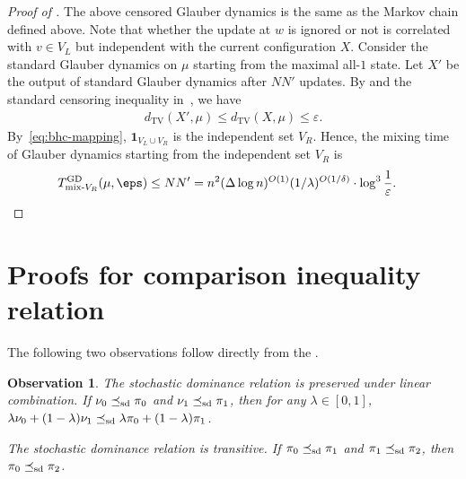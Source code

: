 \documentclass[11pt,a4paper]{article}
\newcommand{\DTV}[2]{d_{\mathrm{TV}}\left({#1},{#2}\right)}
\renewcommand{\epsilon}{\varepsilon}
\newcommand{\sd}{\preceq_{\textnormal{sd}}}
\newtheorem{observation}[theorem]{Observation}
\theoremstyle{definition}
\def\*#1{\mathbf{#1}} %
\begin{document}
\begin{proof}[Proof of ]
The above censored Glauber dynamics is the same as the Markov chain defined above. 
Note that whether the update at $w$ is ignored or not is correlated with $v \in V_L$ but independent with the current configuration $X$.
Consider the standard Glauber dynamics on $\mu$ starting from the maximal all-$1$ state. Let $X'$ be the output of standard Glauber dynamics after $N N'$ updates. By  and the standard censoring inequality in~\cite{peres2013can}, we have
\begin{align*}
    \DTV{X'}{\mu} \leq \DTV{X}{\mu} \leq \epsilon.
\end{align*}
By~\eqref{eq:bhc-mapping}, $\*1_{V_L \cup V_R}$ is the independent set $V_R$.
Hence, the mixing time of Glauber dynamics starting from the independent set $V_R$ is  
\begin{align*}
    T^{\textnormal{GD}}_{\textnormal{mix-}V_R}(\mu,\eps)\leq NN' =  n^2(\Delta\log n)^{O(1)}(1/\lambda)^{O(1/\delta)}\cdot \log^3 \frac{1}{\epsilon}. &\qedhere
\end{align*}
\end{proof}











\appendix


\section{Proofs for comparison inequality relation}\label{sec:proofs-for-comparison-inequality-relation}

The following two observations follow directly from the .
\begin{observation}\label{obs:stochastic-dominance-properties}
The stochastic dominance relation is preserved under linear combination. If $\nu_0 \sd \pi_0$ and $\nu_1 \sd \pi_1$, then for any $\lambda \in [0,1]$, $\lambda \nu_0 + (1-\lambda) \nu_1 \sd \lambda \pi_0 + (1-\lambda) \pi_1$.

The stochastic dominance relation is transitive. If $\pi_0 \sd \pi_1$ and $\pi_1 \sd \pi_2$, then $\pi_0 \sd \pi_2$.
\end{observation}
\end{document}

